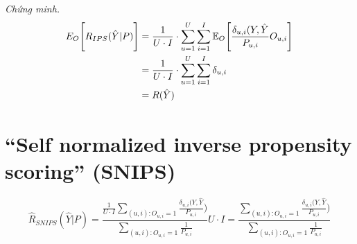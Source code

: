 \textit{Chứng minh.} 
\begin{equation}
\begin{aligned}
\mathcal\mathbb{E}_{O} \Bigg[R_{IPS}(\hat{Y}|P)\Bigg] &=  \frac{1}{U\cdot I} \cdot \sum_{u=1}^{U} \sum_{i=1}^{I} \mathbb{E}_{O} \Bigg[ \frac{\delta_{u,i}(Y,\hat{Y}}{P_{u,i}}{O_{u,i}}\Bigg] \\ &= \frac{1}{U\cdot I} \cdot \sum_{u=1}^{U} \sum_{i=1}^{I}\delta_{u,i} \\ &
= R(\hat{Y})
\end{aligned}
\end{equation}

\section{``Self normalized inverse propensity scoring'' (SNIPS)}


\begin{equation}
\label{eq:snips}
\hat{R}_{SNIPS}(\hat{Y}|P) = \frac{\frac{1}{U \cdot I}\sum_{(u,i):O_{u,i}=1} \frac{ \delta_{u,i} (Y,\hat{Y}}{P_{u,i}})}{\sum_{(u,i):O_{u,i}=1} \frac{1}{P_{u,i}}} U \cdot I = \frac{\sum_{(u,i):O_{u,i}=1} \frac{ \delta_{u,i} (Y,\hat{Y}}{P_{u,i}})}{\sum_{(u,i):O_{u,i}=1} \frac{1}{P_{u,i}}}
\end{equation}

